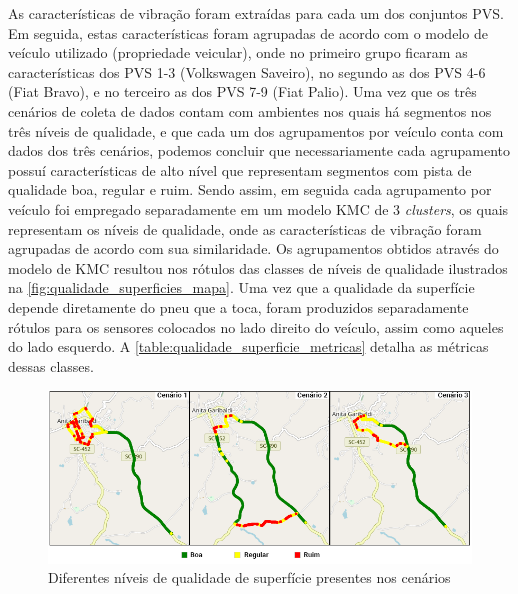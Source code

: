 As características de vibração foram extraídas para cada um dos conjuntos PVS. Em seguida, estas características foram agrupadas de acordo com o modelo de veículo utilizado (propriedade veicular), onde no primeiro grupo ficaram as características dos PVS 1-3 (Volkswagen Saveiro), no segundo as dos PVS 4-6 (Fiat Bravo), e no terceiro as dos PVS 7-9 (Fiat Palio). Uma vez que os três cenários de coleta de dados contam com ambientes nos quais há segmentos nos três níveis de qualidade, e que cada um dos agrupamentos por veículo conta com dados dos três cenários, podemos concluir que necessariamente cada agrupamento possuí características de alto nível que representam segmentos com pista de qualidade boa, regular e ruim. Sendo assim, em seguida cada agrupamento por veículo foi empregado separadamente em um modelo KMC de 3 \textit{clusters}, os quais representam os níveis de qualidade, onde as características de vibração foram agrupadas de acordo com sua similaridade. Os agrupamentos obtidos através do modelo de KMC resultou nos rótulos das classes de níveis de qualidade ilustrados na \autoref{fig:qualidade_superficies_mapa}. Uma vez que a qualidade da superfície depende diretamente do pneu que a toca, foram produzidos separadamente rótulos para os sensores colocados no lado direito do veículo, assim como aqueles do lado esquerdo. A \autoref{table:qualidade_superficie_metricas} detalha as métricas dessas classes.  
 
\begin{figure}[h!]
  \centering
  \caption{Diferentes níveis de qualidade de superfície presentes nos cenários}
   \label{fig:qualidade_superficies_mapa}
   \includegraphics[width=1\textwidth]{figuras/fig_27.png}
\end{figure}

